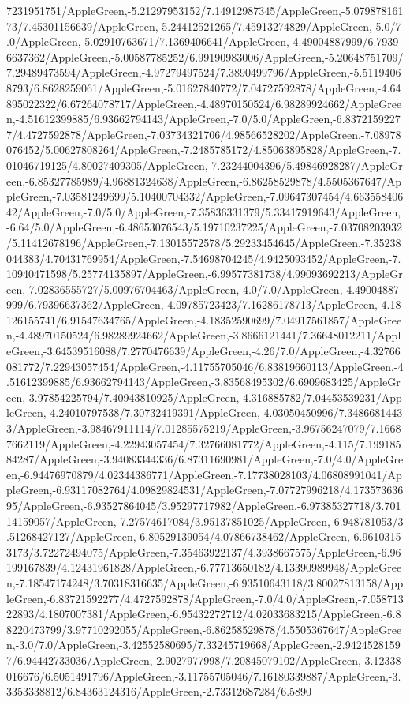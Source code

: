{\begin{tikzternal}
7231951751/AppleGreen,-5.21297953152/7.14912987345/AppleGreen,-5.07987816173/7.45301156639/AppleGreen,-5.24412521265/7.45913274829/AppleGreen,-5.0/7.0/AppleGreen,-5.02910763671/7.1369406641/AppleGreen,-4.49004887999/6.79396637362/AppleGreen,-5.00587785252/6.99190983006/AppleGreen,-5.20648751709/7.29489473594/AppleGreen,-4.97279497524/7.3890499796/AppleGreen,-5.51194068793/6.8628259061/AppleGreen,-5.01627840772/7.04727592878/AppleGreen,-4.64895022322/6.67264078717/AppleGreen,-4.48970150524/6.98289924662/AppleGreen,-4.51612399885/6.93662794143/AppleGreen,-7.0/5.0/AppleGreen,-6.83721592277/4.4727592878/AppleGreen,-7.03734321706/4.98566528202/AppleGreen,-7.08978076452/5.00627808264/AppleGreen,-7.2485785172/4.85063895828/AppleGreen,-7.01046719125/4.80027409305/AppleGreen,-7.23244004396/5.49846928287/AppleGreen,-6.85327785989/4.96881324638/AppleGreen,-6.86258529878/4.5505367647/AppleGreen,-7.03581249699/5.10400704332/AppleGreen,-7.09647307454/4.66355840642/AppleGreen,-7.0/5.0/AppleGreen,-7.35836331379/5.33417919643/AppleGreen,-6.64/5.0/AppleGreen,-6.48653076543/5.19710237225/AppleGreen,-7.03708203932/5.11412678196/AppleGreen,-7.13015572578/5.29233454645/AppleGreen,-7.35238044383/4.70431769954/AppleGreen,-7.54698704245/4.9425093452/AppleGreen,-7.10940471598/5.25774135897/AppleGreen,-6.99577381738/4.99093692213/AppleGreen,-7.02836555727/5.00976704463/AppleGreen,-4.0/7.0/AppleGreen,-4.49004887999/6.79396637362/AppleGreen,-4.09785723423/7.16286178713/AppleGreen,-4.18126155741/6.91547634765/AppleGreen,-4.18352590699/7.04917561857/AppleGreen,-4.48970150524/6.98289924662/AppleGreen,-3.8666121441/7.36648012211/AppleGreen,-3.64539516088/7.2770476639/AppleGreen,-4.26/7.0/AppleGreen,-4.32766081772/7.22943057454/AppleGreen,-4.11755705046/6.83819660113/AppleGreen,-4.51612399885/6.93662794143/AppleGreen,-3.83568495302/6.6909683425/AppleGreen,-3.97854225794/7.40943810925/AppleGreen,-4.316885782/7.04453539231/AppleGreen,-4.24010797538/7.30732419391/AppleGreen,-4.03050450996/7.34866814433/AppleGreen,-3.98467911114/7.01285575219/AppleGreen,-3.96756247079/7.16687662119/AppleGreen,-4.22943057454/7.32766081772/AppleGreen,-4.115/7.19918584287/AppleGreen,-3.94083344336/6.87311690981/AppleGreen,-7.0/4.0/AppleGreen,-6.94476970879/4.02344386771/AppleGreen,-7.17738028103/4.06808991041/AppleGreen,-6.93117082764/4.09829824531/AppleGreen,-7.07727996218/4.17357363695/AppleGreen,-6.93527864045/3.95297717982/AppleGreen,-6.97385327718/3.70114159057/AppleGreen,-7.27574617084/3.95137851025/AppleGreen,-6.948781053/3.51268427127/AppleGreen,-6.80529139054/4.07866738462/AppleGreen,-6.96103153173/3.72272494075/AppleGreen,-7.35463922137/4.3938667575/AppleGreen,-6.96199167839/4.12431961828/AppleGreen,-6.77713650182/4.13390989948/AppleGreen,-7.18547174248/3.70318316635/AppleGreen,-6.93510643118/3.80027813158/AppleGreen,-6.83721592277/4.4727592878/AppleGreen,-7.0/4.0/AppleGreen,-7.05871322893/4.1807007381/AppleGreen,-6.95432272712/4.02033683215/AppleGreen,-6.88220473799/3.97710292055/AppleGreen,-6.86258529878/4.5505367647/AppleGreen,-3.0/7.0/AppleGreen,-3.42552580695/7.33245719668/AppleGreen,-2.94245281597/6.94442733036/AppleGreen,-2.9027977998/7.20845079102/AppleGreen,-3.12338016676/6.5051491796/AppleGreen,-3.11755705046/7.16180339887/AppleGreen,-3.3353338812/6.84363124316/AppleGreen,-2.73312687284/6.5890
\end{tikzternal}}
